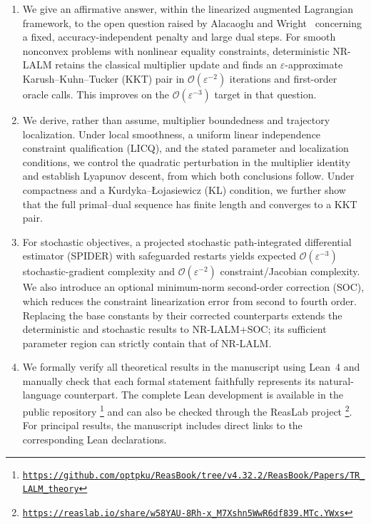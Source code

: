 \documentclass[11pt]{article}
\theoremstyle{definition}
\theoremstyle{remark}
\numberwithin{equation}{section}
\numberwithin{figure}{section}
\numberwithin{table}{section}
\numberwithin{algorithm}{section}
\newcommand{\cO}{\mathcal{O}}
\begin{document}
\begin{enumerate}[leftmargin=1.8em,labelsep=0.5em,itemsep=0em,topsep=0.1em]
    \item We give an affirmative answer, within the linearized augmented Lagrangian framework, to the open question raised by Alacaoglu and Wright~\cite{AlacaogluWright2024} concerning a fixed, accuracy-independent penalty and large dual steps.  For smooth nonconvex problems with nonlinear equality constraints, deterministic NR-LALM retains the classical multiplier update and finds an $\varepsilon$-approximate Karush--Kuhn--Tucker (KKT) pair in $\cO(\varepsilon^{-2})$ iterations and first-order oracle calls.  This improves on the $\cO(\varepsilon^{-3})$ target in that question.

    \item We derive, rather than assume, multiplier boundedness and trajectory localization.  Under local smoothness, a uniform linear independence constraint qualification (LICQ), and the stated parameter and localization conditions, we control the quadratic perturbation in the multiplier identity and establish Lyapunov descent, from which both conclusions follow.  Under compactness and a Kurdyka--{\L}ojasiewicz (KL) condition, we further show that the full primal--dual sequence has finite length and converges to a KKT pair.

    \item For stochastic objectives, a projected stochastic path-integrated differential estimator (SPIDER) with safeguarded restarts yields expected $\cO(\varepsilon^{-3})$ stochastic-gradient complexity and $\cO(\varepsilon^{-2})$ constraint/Jacobian complexity.  We also introduce an optional minimum-norm second-order correction (SOC), which reduces the
    constraint linearization error from second to fourth order.  Replacing the base constants by their corrected counterparts extends the deterministic and stochastic results to NR-LALM+SOC; its sufficient parameter region can
    strictly contain that of NR-LALM.

    \item We formally verify all theoretical results in the manuscript using Lean~4 and manually check that each formal statement faithfully represents its natural-language counterpart.  The complete Lean development is available in the public repository%
     \footnote{\href{https://github.com/optpku/ReasBook/tree/v4.32.2/ReasBook/Papers/TR_LALM_theory}%
      {\nolinkurl{https://github.com/optpku/ReasBook/tree/v4.32.2/ReasBook/Papers/TR_LALM_theory}}} and can also be checked through the ReasLab project%
      \footnote{\href{https://reaslab.io/share/w58YAU-8Rh-x_M7Xshn5WwR6df839.MTc.YWxs}%
      {\nolinkurl{https://reaslab.io/share/w58YAU-8Rh-x_M7Xshn5WwR6df839.MTc.YWxs}}}. For principal results, the manuscript includes direct links to the corresponding Lean declarations.
\end{enumerate}
\end{document}

